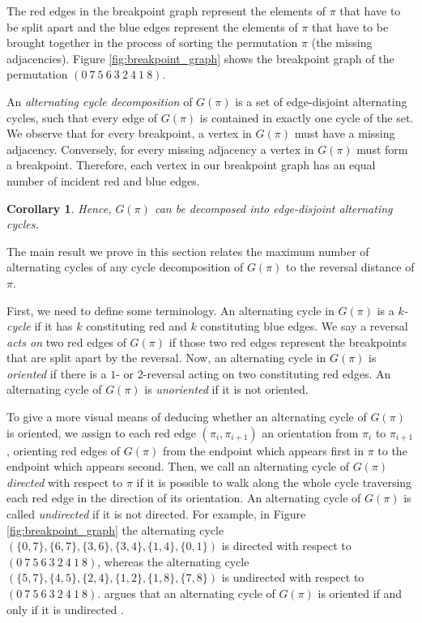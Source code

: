 \documentclass[11pt,DIV=11]{scrartcl}
\def\padding{\vspace{2em}}
\newtheorem{corollary}{Corollary}[theorem]
\theoremstyle{definition}
\theoremstyle{remark}
\begin{document}
The red edges in the breakpoint graph represent the elements of $\pi$ that have to be split apart and the blue edges represent the elements of $\pi$ that have to be brought together in the process of sorting the permutation $\pi$ (the missing adjacencies). Figure \ref{fig:breakpoint_graph} shows the breakpoint graph of the permutation $(0\ 7\ 5\ 6\ 3\ 2\ 4\ 1\ 8)$.

An \textit{alternating cycle decomposition} of $G(\pi)$ is a set of edge-disjoint alternating cycles, such that every edge of $G(\pi)$ is contained in exactly one cycle of the set. We observe that for every breakpoint, a vertex in $G(\pi)$ must have a missing adjacency. Conversely, for every missing adjacency a vertex in $G(\pi)$ must form a breakpoint. Therefore, each vertex in our breakpoint graph has an equal number of incident red and blue edges.

\begin{corollary}
Hence, $G(\pi)$ can be decomposed into edge-disjoint alternating cycles.
\end{corollary}

The main result we prove in this section relates the maximum number of alternating cycles of any cycle decomposition of $G(\pi)$ to the reversal distance of $\pi$.\padding

First, we need to define some terminology. An alternating cycle in $G(\pi)$ is a \textit{$k$-cycle} if it has $k$ constituting red and $k$ constituting blue edges. We say a reversal \textit{acts on} two red edges of $G(\pi)$ if those two red edges represent the breakpoints that are split apart by the reversal. Now, an alternating cycle in $G(\pi)$ is \textit{oriented} if there is a $1$- or $2$-reversal acting on two constituting red edges. An alternating cycle of $G(\pi)$ is \textit{unoriented} if it is not oriented.

To give a more visual means of deducing whether an alternating cycle of $G(\pi)$ is oriented, we assign to each red edge $(\pi_i, \pi_{i+1})$ an orientation from $\pi_i$ to $\pi_{i+1}$, orienting red edges of $G(\pi)$ from the endpoint which appears first in $\pi$ to the endpoint which appears second. Then, we call an alternating cycle of $G(\pi)$ \textit{directed} with respect to $\pi$ if it is possible to walk along the whole cycle traversing each red edge in the direction of its orientation. An alternating cycle of $G(\pi)$ is called \textit{undirected} if it is not directed. For example, in Figure \ref{fig:breakpoint_graph} the alternating cycle $(\{0,7\},\{6,7\},\{3,6\},\{3,4\},\{1,4\},\{0,1\})$ is directed with respect to $(0\ 7\ 5\ 6\ 3\ 2\ 4\ 1\ 8)$, whereas the alternating cycle $(\{5,7\},\{4,5\},\{2,4\},\{1,2\},\{1,8\},\{7,8\})$ is undirected with respect to $(0\ 7\ 5\ 6\ 3\ 2\ 4\ 1\ 8)$. \citeauthor*{Caprara1997} argues that an alternating cycle of $G(\pi)$ is oriented if and only if it is undirected \cite{Caprara1997}.
\end{document}
